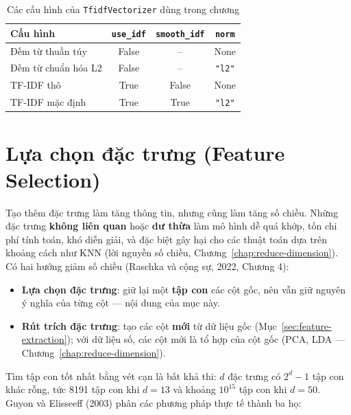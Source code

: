 \begin{table}[H]
\centering
\begin{tabular}{|l|c|c|c|}
\hline
\textbf{Cấu hình} & \texttt{use\_idf} & \texttt{smooth\_idf} & \texttt{norm} \\
\hline
Đếm từ thuần túy & False & -- & None \\ \hline
Đếm từ chuẩn hóa L2 & False & -- & \texttt{"l2"} \\ \hline
TF-IDF thô & True & False & None \\ \hline
TF-IDF mặc định & True & True & \texttt{"l2"} \\ \hline
\end{tabular}
\caption{Các cấu hình của \texttt{TfidfVectorizer} dùng trong chương}
\end{table}

\section{Lựa chọn đặc trưng (Feature Selection)}
\label{sec:feature-selection}

Tạo thêm đặc trưng làm tăng thông tin, nhưng cũng làm tăng số chiều. Những đặc trưng \textbf{không liên quan} hoặc \textbf{dư thừa} làm mô hình dễ quá khớp, tốn chi phí tính toán, khó diễn giải, và đặc biệt gây hại cho các thuật toán dựa trên khoảng cách như KNN (lời nguyền số chiều, Chương~\ref{chap:reduce-dimension}). Có hai hướng giảm số chiều (Raschka và cộng sự, 2022, Chương 4):
\begin{itemize}
    \item \textbf{Lựa chọn đặc trưng}: giữ lại một \textbf{tập con} các cột gốc, nên vẫn giữ nguyên ý nghĩa của từng cột --- nội dung của mục này.
    \item \textbf{Rút trích đặc trưng}: tạo các cột \textbf{mới} từ dữ liệu gốc (Mục~\ref{sec:feature-extraction}); với dữ liệu số, các cột mới là tổ hợp của cột gốc (PCA, LDA --- Chương~\ref{chap:reduce-dimension}).
\end{itemize}
Tìm tập con tốt nhất bằng vét cạn là bất khả thi: $d$ đặc trưng có $2^d - 1$ tập con khác rỗng, tức 8191 tập con khi $d = 13$ và khoảng $10^{15}$ tập con khi $d = 50$. Guyon và Elisseeff (2003) phân các phương pháp thực tế thành ba họ:

